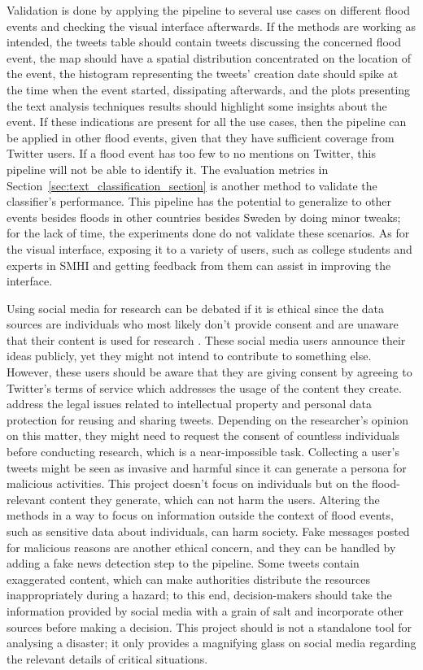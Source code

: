 Validation is done by applying the pipeline to several use cases on different flood events and
checking the visual interface afterwards. If the methods are working as intended, the tweets table
should contain tweets discussing the concerned flood event, the map should have a spatial
distribution concentrated on the location of the event, the histogram representing the tweets'
creation date should spike at the time when the event started, dissipating afterwards, and the plots
presenting the text analysis techniques results should highlight some insights about the event. If
these indications are present for all the use cases, then the pipeline can be applied in other flood
events, given that they have sufficient coverage from Twitter users. If a flood event has too few to
no mentions on Twitter, this pipeline will not be able to identify it. The evaluation metrics in
Section~\ref{sec:text_classification_section} is another method to validate the classifier's
performance. This pipeline has the potential to generalize to other events besides floods in other
countries besides Sweden by doing minor tweaks; for the lack of time, the experiments done do not
validate these scenarios. As for the visual interface, exposing it to a variety of users, such as
college students and experts in \ac{SMHI} and getting feedback from them can assist in improving the
interface.

Using social media for research can be debated if it is ethical since the data sources are
individuals who most likely don't provide consent and are unaware that their content is used for
research \cite{zimmerItEthicalHarvest2010}. These social media users announce their ideas publicly,
yet they might not intend to contribute to something else. However, these users should be aware that
they are giving consent by agreeing to Twitter's terms of service which addresses the usage of the
content they create.  address the legal issues related to
intellectual property and personal data protection for reusing and sharing tweets. Depending on the
researcher's opinion on this matter, they might need to request the consent of countless individuals
before conducting research, which is a near-impossible task. Collecting a user's tweets might be
seen as invasive and harmful since it can generate a persona for malicious activities. This project
doesn't focus on individuals but on the flood-relevant content they generate, which can not harm the
users. Altering the methods in a way to focus on information outside the context of flood events,
such as sensitive data about individuals, can harm society. Fake messages posted for malicious
reasons are another ethical concern, and they can be handled by adding a fake news detection step to
the pipeline. Some tweets contain exaggerated content, which can make authorities distribute the
resources inappropriately during a hazard; to this end, decision-makers should take the information
provided by social media with a grain of salt and incorporate other sources before making a
decision. This project should is not a standalone tool for analysing a disaster;  it only provides a
magnifying glass on social media regarding the relevant details of critical situations.
